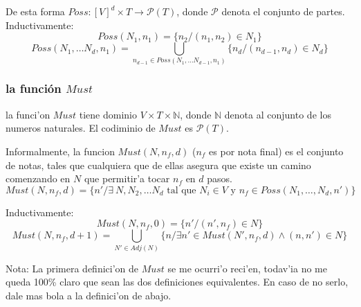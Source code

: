 De esta forma $Poss : [V]^d \times T \rightarrow \mathcal{P}(T)$, donde $\mathcal{P}$ denota el conjunto de partes.
Inductivamente:
$$Poss(N_1, n_1)= \{ n_2 / (n_1, n_2) \in N_1 \}$$
$$Poss(N_1, \dots N_d, n_1)= \bigcup_{n_{d-1} \in Poss(N_1, \dots N_{d-1}, n_1)} \{ n_d / (n_{d-1}, n_d) \in N_d \}$$


\subsubsection{la funci\'on $Must$}
la funci'on $Must$ tiene dominio $V \times T \times \mathbb{N}$, donde $\mathbb{N}$ denota al conjunto de los numeros naturales.
El codiminio de $Must$ es $\mathcal{P}(T)$.

Informalmente, la funcion $Must(N, n_f, d)$ ($n_f$ es por nota final) es el conjunto de notas, tales que cualquiera que de ellas 
asegura que existe un camino comenzando en $N$ que permitir'a tocar $n_f$ en $d$ pasos.
$$Must(N, n_f, d)= \{ n' / \exists\ N, N_2, \dots N_d \text{ tal que } N_i \in V \text{ y } n_f \in Poss(N_1, \dots, N_d, n') \}$$
 
Inductivamente:
$$Must(N, n_f, 0)= \{n' / (n', n_f) \in N\}$$
$$Must(N, n_f, d+1) = \bigcup_{N' \in Adj(N)}\{n / \exists n' \in Must(N', n_f, d) \land (n, n') \in N \}$$

Nota: La primera definici'on de $Must$ se me ocurri'o reci'en, todav'ia no me queda 100\% claro que sean las dos definiciones equivalentes. En caso de no serlo, dale 
mas bola a la definici'on de abajo.

